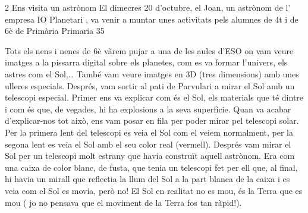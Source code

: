 %
%
\begin{news}
{2} %
{Ens visita un astrònom}
{El dimecres 20 d’octubre, el Joan,  un astrònom  de l’ empresa IO Planetari , va venir a muntar unes activitats pels alumnes de 4t i de 6è de Primària}
{Primaria}
{35} %

\noindent{}

Tots els nens i nenes de 6è vàrem pujar a una de les aules d’ESO on vam veure imatges a la pissarra digital sobre els planetes, com es va formar l’univers, els astres com el Sol,… També vam veure imatges en 3D (tres dimensions) amb unes ulleres especials. Després, vam sortir al pati de Parvulari a mirar el Sol amb un telescopi especial. Primer ens va explicar com és el Sol, els materials que té  dintre i com és que, de vegades, hi ha explosions a la seva superfície. Quan va acabar d’explicar-nos tot això, ens vam posar en fila per poder mirar pel telescopi solar. Per la primera lent del telescopi es veia el Sol com el veiem normalment, per la segona lent es veia el Sol amb el seu color real (vermell). Després vam mirar el Sol per un telescopi molt estrany que havia construït aquell astrònom. Era com una caixa de color blanc, de fusta, que tenia un telescopi  fet per ell que, al final,  hi havia un mirall que reflectia la llum del Sol a la part blanca de la caixa i es veia com el Sol es movia, però no!  El Sol en realitat no es mou, és la Terra que es mou ( jo no pensava que el moviment de la Terra fos tan ràpid!). 


\noindent{}

\noindent{}
  
\end{news}
